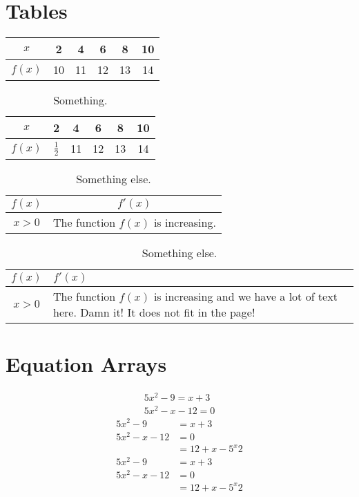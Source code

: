 \documentclass{article}
\begin{document}
\section{Tables}
  \begin{tabular}{|c|c|c|c|c|c|}
    \hline
    \(x\) & 2 & 4 & 6 & 8 & 10 \\ \hline
    \(f(x)\) & 10 & 11 & 12 & 13 & 14 \\
    \hline
  \end{tabular}
\vspace{1cm}
\begin{table}[h]
  \centering
  \def\arraystretch{1.5}
  \begin{tabular}{|c|c|c|c|c|c|}
    \hline
    \(x\) & 2 & 4 & 6 & 8 & 10 \\ \hline
    \(f(x)\) & $\frac{1}{2}$ & 11 & 12 & 13 & 14 \\
    \hline
  \end{tabular}
  \caption{Something.}
\end{table} %
\begin{table}[h]
  \centering
  \def\arraystretch{1.5}
  \begin{tabular}{|c|c|}
    \hline
    \(f(x)\) & \(f'(x)\) \\ \hline
    \(x>0\) & The function \(f(x)\) is increasing. \\
    \hline
  \end{tabular}
  \caption{Something else.}
\end{table}
\begin{table}[h]
  \centering
  \def\arraystretch{1.5}
  \begin{tabular}{|c|p{5.5cm}|} %
    \hline
    \(f(x)\) & \(f'(x)\) \\ \hline
    \(x>0\) & The function \(f(x)\) is increasing and we have a lot of text here. Damn it! It does not fit in the page! \\
    \hline
  \end{tabular}
  \caption{Something else.}
\end{table}
\section{Equation Arrays}
  \begin{align}
    5x^{2}-9=x+3\\
    5x^{2}-x-12=0
  \end{align}
      \begin{align*} %
    5x^{2}-9&=x+3\\
    5x^{2}-x-12&=0 \\
    &=12+x-5^x{2}
  \end{align*}
    \begin{align} %
    5x^{2}-9&=x+3\\
    5x^{2}-x-12&=0 \\
    &=12+x-5^x{2}
  \end{align}
\end{document}
